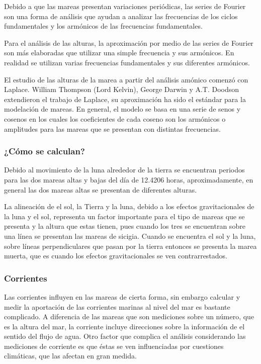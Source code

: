 Debido a que las mareas presentan variaciones periódicas, las series de Fourier son una forma de análisis que ayudan a analizar las frecuencias de los ciclos fundamentales y los armónicos de las frecuencias fundamentales.

Para el análisis de las alturas, la aproximación por medio de las series de Fourier son más elaboradas que utilizar una simple frecuencia y sus armónicos. En realidad se utilizan varias frecuencias fundamentales y sus diferentes armónicos.

El estudio de las alturas de la marea a partir del análisis amónico comenzó con Laplace. William Thompson (Lord Kelvin), George Darwin y A.T. Doodson extendieron el trabajo de Laplace, su aproximación ha sido el estándar para la modelación de mareas. En general, el modelo se basa en una serie de senos y cosenos en los cuales los coeficientes de cada coseno son los armónicos o amplitudes para las mareas que se presentan con distintas frecuencias.

\subsubsection{¿Cómo se calculan?}
Debido al movimiento de la luna alrededor de la tierra se encuentran periodos para las dos mareas altas y bajas del día de 12.4206 horas, aproximadamente, en general las dos mareas altas se presentan de diferentes alturas.

La alineación de el sol, la Tierra y la luna, debido a los efectos gravitacionales de la luna y el sol, representa un factor importante para el tipo de mareas que se presenta y la altura que estas tienen, pues cuando los tres se encuentran sobre una línea se presentan las mareas de sicigia. Cuando se encuentra el sol y la luna, sobre líneas perpendiculares que pasan por la tierra entonces se presenta la marea muerta, que es cuando los efectos gravitacionales se ven contrarrestados. 

\subsubsection{Corrientes}
Las corrientes influyen en las mareas de cierta forma, sin embargo calcular y medir la aportación de las corrientes marinas al nivel del mar es bastante complicado. A diferencia de las mareas que son mediciones sobre un número, que es la altura del mar, la corriente incluye direcciones sobre la información de el sentido del flujo de agua.
Otro factor que complica el análisis considerando las mediciones de corriente es que éstas se ven influenciadas por cuestiones climáticas, que las afectan en gran medida.

